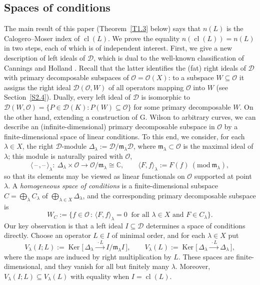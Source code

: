 \documentclass[11pt,reqno]{amsart}
\theoremstyle{plain}
\theoremstyle{definition}
\theoremstyle{remark}
\numberwithin{equation}{section}
\newcommand{\cD}{\mathcal{D}}
\newcommand{\cO}{\mathcal{O}}
\newcommand{\C}{\mathbb{C}}
\newcommand{\ml}{\mathfrak{m}_\lambda}
\newcommand{\Dl}{\Delta_\lambda}
\newcommand{\lan}{\langle}
\newcommand{\ran}{\rangle}
\DeclareMathOperator{\cl}{cl}
\DeclareMathOperator{\Ker}{Ker}
\begin{document}
\subsection*{Spaces of conditions}
The main result of this paper (Theorem~\ref{T1.3} below) says that $n(L)$ is the Calogero--Moser
index of $\cl(L)$. We prove the equality $n(\cl(L)) = n(L) $ in two steps, each of which is of independent interest. First, we
give a new description of left ideals of $\cD$, which is dual to the well-known classification of
Cannings and Holland \cite{CanningsHolland1994}. Recall that the latter identifies the (fat)
right ideals of $\cD$ with primary decomposable subspaces of $\cO = \cO(X)$: to a subspace
$W \subseteq \cO$ it assigns the right ideal $\cD(\cO, W)$ of all operators mapping $\cO$ into $W$
(see Section~\ref{S2.4}). Dually, every left ideal of $\cD$ is isomorphic to
$\cD(W, \cO) = \{ P \in \cD(K) : P(W) \subseteq \cO \}$ for some primary decomposable $W$. 
On the other hand, extending a construction of G. Wilson \cite{Wilson1993} to arbitrary curves,
we can describe an (infinite-dimensional) primary decomposable subspace in $\cO $ by a finite-dimensional space of linear conditions. To this end, we consider,
for each $\lambda \in X$,  the right $\cD$-module $\Dl := \cD/\ml \cD$, where $\ml \subset \cO$ is
the maximal ideal of $\lambda$; this module is naturally paired with $\cO$,
\begin{equation}
\label{E16}
  \lan\,\text{--}\,,\text{--}\,\ran_\lambda : \ \Dl \times \cO \to \cO/\ml \cong \C ,
  \qquad \lan F, f \ran_\lambda := F(f) \ (\mathrm{mod}\ \ml) ,
\end{equation}
so that its elements may be viewed as linear functionals on $\cO$ supported at point $\lambda$. A
\emph{homogeneous space of conditions} is a finite-dimensional subspace
$C = \bigoplus_{\lambda} C_\lambda$ of $\bigoplus_{\lambda \in X} \Dl$, and the corresponding
primary decomposable subspace is
\begin{equation}
\label{E17}
  W_C := \{ f \in \cO \, : \, \lan F, f \ran_\lambda = 0 \ \text{ for all } \lambda \in X
  \text{ and } F \in C_\lambda \} .
\end{equation}
Our key observation is that a left ideal $I \subseteq \cD$ determines a space of conditions
directly. Choose an operator $L \in I$ of minimal order, and for each $\lambda \in X$ put
\begin{equation}
\label{E18}
  V_\lambda(I; L) := \Ker\bigl[\, \Dl \xrightarrow{\ \cdot L \ } I/\ml I \,\bigr] ,
  \qquad V_\lambda(L) := \Ker\bigl[\, \Dl \xrightarrow{\ \cdot L \ } \Dl \,\bigr] ,
\end{equation}
where the maps are induced by right multiplication by $L$. These spaces are finite-dimensional,
and they vanish for all but finitely many $\lambda$. Moreover, $V_\lambda(I;L) \subseteq V_\lambda(L)$
with equality when $I = \cl(L)$.
\end{document}
